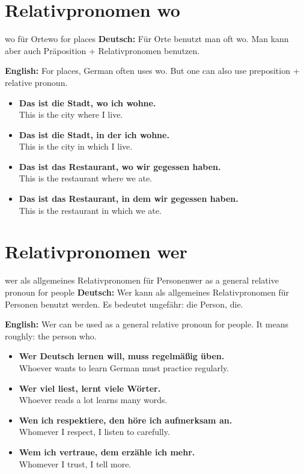 \documentclass[a4paper,11pt]{article}
\newcommand{\GermanText}[1]{\textbf{Deutsch: }#1\par}
\newcommand{\EnglishText}[1]{{\small\color{SoftGray}\textbf{English: }#1\par}}
\newcommand{\ExampleItem}[2]{\item \textbf{#1}\\{\small\color{SoftGray}#2}}
\begin{document}
    
    \section{Relativpronomen wo}
        
        \begin{grammarentry}{wo für Orte}{wo for places}
            \GermanText{Für Orte benutzt man oft wo. Man kann aber auch Präposition + Relativpronomen benutzen.}
            \EnglishText{For places, German often uses wo. But one can also use preposition + relative pronoun.}
            
            \begin{exbox}
                \begin{itemize}
                    \ExampleItem{Das ist die Stadt, wo ich wohne.}{This is the city where I live.}
                    \ExampleItem{Das ist die Stadt, in der ich wohne.}{This is the city in which I live.}
                    \ExampleItem{Das ist das Restaurant, wo wir gegessen haben.}{This is the restaurant where we ate.}
                    \ExampleItem{Das ist das Restaurant, in dem wir gegessen haben.}{This is the restaurant in which we ate.}
                \end{itemize}
            \end{exbox}
        \end{grammarentry}
    
    
    \section{Relativpronomen wer}
        
        \begin{grammarentry}{wer als allgemeines Relativpronomen für Personen}{wer as a general relative pronoun for people}
            \GermanText{Wer kann als allgemeines Relativpronomen für Personen benutzt werden. Es bedeutet ungefähr: die Person, die.}
            \EnglishText{Wer can be used as a general relative pronoun for people. It means roughly: the person who.}
            
            \begin{exbox}
                \begin{itemize}
                    \ExampleItem{Wer Deutsch lernen will, muss regelmäßig üben.}{Whoever wants to learn German must practice regularly.}
                    \ExampleItem{Wer viel liest, lernt viele Wörter.}{Whoever reads a lot learns many words.}
                    \ExampleItem{Wen ich respektiere, den höre ich aufmerksam an.}{Whomever I respect, I listen to carefully.}
                    \ExampleItem{Wem ich vertraue, dem erzähle ich mehr.}{Whomever I trust, I tell more.}
                \end{itemize}
            \end{exbox}
        \end{grammarentry}
    
\end{document}
